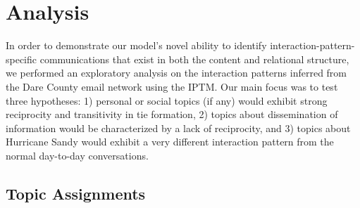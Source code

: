 \documentclass[twoside]{article}
\begin{document}
\section{Analysis}\label{sec:Analysis}
In order to demonstrate our model's novel ability to identify interaction-pattern-specific communications that exist in both the content and relational structure, we performed an exploratory analysis on the interaction patterns inferred from the Dare County email network using the IPTM. Our main focus was to test three hypotheses: 1) personal or social topics (if any) would exhibit strong reciprocity and transitivity in tie formation, 2) topics about dissemination of information would be characterized by a lack of reciprocity, and 3) topics about Hurricane Sandy would exhibit a very different
interaction pattern from the normal day-to-day conversations.
\subsection{Topic Assignments}\label{subsec:Topic Assignments}
\begin{center}
	\end{center}
\end{document}
